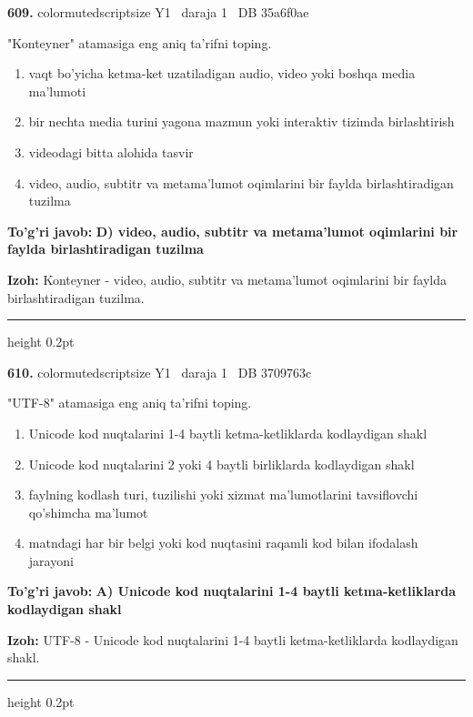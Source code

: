 \documentclass[10pt,a4paper,oneside]{article}
\begin{document}
\noindent\textbf{\color{ink}609.}  {color{muted}scriptsize Y1 \textbullet\ daraja 1 \textbullet\ DB 35a6f0ae}
\par
"Konteyner" atamasiga eng aniq ta'rifni toping.
\begin{enumerate}[label=\Alph*),leftmargin=9mm]
\item vaqt bo'yicha ketma-ket uzatiladigan audio, video yoki boshqa media ma'lumoti
\item bir nechta media turini yagona mazmun yoki interaktiv tizimda birlashtirish
\item videodagi bitta alohida tasvir
\item video, audio, subtitr va metama'lumot oqimlarini bir faylda birlashtiradigan tuzilma
\end{enumerate}
\begin{tcolorbox}[enhanced,breakable,colback=teal!4,colframe=teal!50!black,boxrule=0.5pt,arc=1.1mm,left=3mm,right=3mm,top=1.7mm,bottom=1.7mm,before skip=2mm,after skip=2mm]
\textbf{\color{teal}To'g'ri javob:} \textbf{D) video, audio, subtitr va metama'lumot oqimlarini bir faylda birlashtiradigan tuzilma}
\par\smallskip
\textbf{Izoh:} Konteyner - video, audio, subtitr va metama'lumot oqimlarini bir faylda birlashtiradigan tuzilma.
\end{tcolorbox}
\vspace{2mm}\hrule height 0.2pt \vspace{3mm}

\noindent\textbf{\color{ink}610.}  {color{muted}scriptsize Y1 \textbullet\ daraja 1 \textbullet\ DB 3709763c}
\par
"UTF-8" atamasiga eng aniq ta'rifni toping.
\begin{enumerate}[label=\Alph*),leftmargin=9mm]
\item Unicode kod nuqtalarini 1-4 baytli ketma-ketliklarda kodlaydigan shakl
\item Unicode kod nuqtalarini 2 yoki 4 baytli birliklarda kodlaydigan shakl
\item faylning kodlash turi, tuzilishi yoki xizmat ma'lumotlarini tavsiflovchi qo'shimcha ma'lumot
\item matndagi har bir belgi yoki kod nuqtasini raqamli kod bilan ifodalash jarayoni
\end{enumerate}
\begin{tcolorbox}[enhanced,breakable,colback=teal!4,colframe=teal!50!black,boxrule=0.5pt,arc=1.1mm,left=3mm,right=3mm,top=1.7mm,bottom=1.7mm,before skip=2mm,after skip=2mm]
\textbf{\color{teal}To'g'ri javob:} \textbf{A) Unicode kod nuqtalarini 1-4 baytli ketma-ketliklarda kodlaydigan shakl}
\par\smallskip
\textbf{Izoh:} UTF-8 - Unicode kod nuqtalarini 1-4 baytli ketma-ketliklarda kodlaydigan shakl.
\end{tcolorbox}
\vspace{2mm}\hrule height 0.2pt \vspace{3mm}
\end{document}
